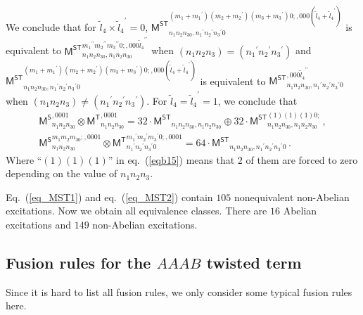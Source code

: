 \documentclass[11pt,nofootinbib,preprint]{revtex4-1}
\begin{document}
We conclude that for $\tilde{l}_4\times{\tilde{l}_4}^{\prime}=0$, ${\mathsf{M}^{\mathsf{ST}}}_{n_1n_2n_30,{n_1}^{\prime}{n_2}^{\prime}{n_3}^{\prime}0}^{\left( m_1+{m_1}^{\prime} \right) \left( m_2+{m_2}^{\prime} \right) \left( m_3+{m_3}^{\prime} \right) 0;,000\left( \tilde{l}_4+{\tilde{l}_4}^{\prime} \right)}$ is equivalent to ${\mathsf{M}^{\mathsf{ST}}}_{n_1n_2n_30,n_1n_2n_30}^{{m_1}^{\prime\prime}{m_2}^{\prime\prime}{m_3}^{\prime\prime}0;,000{\tilde{l}_4}^{\prime\prime}}$ when $\left(n_1n_2n_3\right)=\left({n_1}^{\prime}{n_2}^{\prime}{n_3}^{\prime}\right)$ and ${\mathsf{M}^{\mathsf{ST}}}_{n_1n_2n_30,{n_1}^{\prime}{n_2}^{\prime}{n_3}^{\prime}0}^{\left( m_1+{m_1}^{\prime} \right) \left( m_2+{m_2}^{\prime} \right) \left( m_3+{m_3}^{\prime} \right) 0;,000\left( \tilde{l}_4+{\tilde{l}_4}^{\prime} \right)}$ is equivalent to ${\mathsf{M}^{\mathsf{ST}}}_{n_1n_2n_30,{n_1}^{\prime}{n_2}^{\prime}{n_3}^{\prime}0}^{,000{\tilde{l}_4}^{\prime\prime}}$ when $\left(n_1n_2n_3\right)\ne\left({n_1}^{\prime}{n_2}^{\prime}{n_3}^{\prime}\right)$. For $\tilde{l}_4={\tilde{l}_4}^{\prime}=1$, we conclude that
\begin{gather}
	{\mathsf{M}^{\mathsf{S}}}_{n_1n_2n_30}^{,0001}\otimes {\mathsf{M}^{\mathsf{T}}}_{n_1n_2n_30}^{,0001}	=32\cdot {\mathsf{M}^{\mathsf{ST}}}_{n_1n_2n_30,n_1n_2n_30}\oplus 32\cdot {\mathsf{M}^{\mathsf{ST}}}_{n_1n_2n_30,n_1n_2n_30}^{\left( 1 \right) \left( 1 \right) \left( 1 \right) 0;} \,,\label{eqb15}
	\\
	{\mathsf{M}^{\mathsf{S}}}_{n_1n_2n_30}^{m_1m_2m_30;,0001}\otimes {\mathsf{M}^{\mathsf{T}}}_{{n_1}^{\prime}{n_2}^{\prime}{n_3}^{\prime}0}^{{m_1}^{\prime}{m_2}^{\prime}{m_3}^{\prime}0;,0001}=64\cdot {\mathsf{M}^{\mathsf{ST}}}_{n_1n_2n_30,{n_1}^{\prime}{n_2}^{\prime}{n_3}^{\prime}0}\,.
\end{gather}
Where ``$\left( 1 \right) \left( 1 \right) \left( 1 \right)$'' in eq.~(\ref{eqb15}) means that $2$ of them are forced to zero depending on the value of $n_1n_2n_3$. 

Eq.~(\ref{eq_MST1}) and eq.~(\ref{eq_MST2}) contain $105$ nonequivalent non-Abelian excitations. Now we obtain all equivalence classes. There are $16$ Abelian excitations and $149$ non-Abelian excitations.

\subsection{Fusion rules for the $AAAB$ twisted term}
Since it is hard to list all fusion rules, we only consider some typical fusion rules here.  
\end{document}
